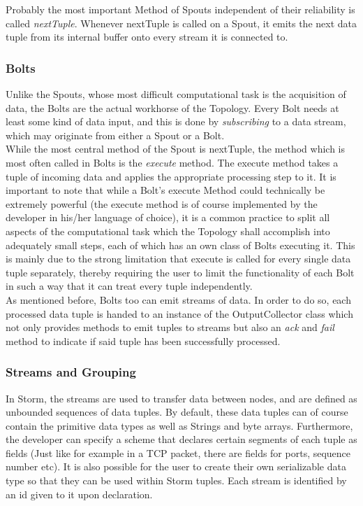 \documentclass[12pt,a4paper]{article}
\begin{document}
Probably the most important Method of Spouts independent of their reliability is called \textit{nextTuple}. Whenever nextTuple is called on a Spout, it emits the next data tuple from its internal buffer onto every stream it is connected to.

\subsubsection{Bolts}

Unlike the Spouts, whose most difficult computational task is the acquisition of data, the Bolts are the actual workhorse of the Topology. Every Bolt needs at least some kind of data input, and this is done by \textit{subscribing} to a data stream, which may originate from either a Spout or a Bolt.\\

While the most central method of the Spout is nextTuple, the method which is most often called in Bolts is the \textit{execute} method. The execute method takes a tuple of incoming data and applies the appropriate processing step to it. It is important to note that while a Bolt's execute Method could technically be extremely powerful (the execute method is of course implemented by the developer in his/her language of choice), it is a common practice to split all aspects of the computational task which the Topology shall accomplish into adequately small steps, each of which has an own class of Bolts executing it. This is mainly due to the strong limitation that execute is called for every single data tuple separately, thereby requiring the user to limit the functionality of each Bolt in such a way that it can treat every tuple independently.\\

As mentioned before, Bolts too can emit streams of data. In order to do so, each processed data tuple is handed to an instance of the OutputCollector class which not only provides methods to emit tuples to streams but also an \textit{ack} and \textit{fail} method to indicate if said tuple has been successfully processed.

\subsubsection{Streams and Grouping}

In Storm, the streams are used to transfer data between nodes, and are defined as unbounded sequences of data tuples. By default, these data tuples can of course contain the primitive data types as well as Strings and byte arrays. Furthermore, the developer can specify a scheme that declares certain segments of each tuple as fields (Just like for example in a TCP packet, there are fields for ports, sequence number etc). It is also possible for the user to create their own serializable data type so that they can be used within Storm tuples. Each stream is identified by an id given to it upon declaration.\\
\end{document}
